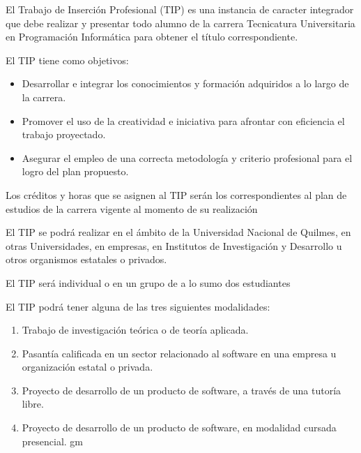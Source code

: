 


\articulo El Trabajo de Inserción Profesional (TIP) es una instancia de
caracter integrador que debe realizar y presentar todo alumno de la carrera
Tecnicatura Universitaria en Programación Informática para obtener el título
correspondiente.

\articulo El TIP tiene como objetivos:
\begin{itemize}
 \item Desarrollar e integrar los conocimientos y formación adquiridos a lo
 largo de la carrera.
 \item Promover el uso de la creatividad e iniciativa para afrontar con
 eficiencia el trabajo proyectado.
 \item Asegurar el empleo de una correcta metodología y criterio
 profesional para el logro del plan propuesto.
\end{itemize}

\articulo Los créditos y horas que se asignen al TIP serán los
correspondientes al plan de estudios de la carrera vigente al momento de su
realización


\articulo El TIP se podrá realizar en el ámbito de la Universidad Nacional de
Quilmes, en otras Universidades, en empresas, en Institutos de Investigación y
Desarrollo u otros organismos estatales o privados. 

\articulo El TIP será individual o en un grupo de a lo sumo dos estudiantes

\articulo El TIP podrá tener alguna de las tres siguientes modalidades:
\begin{enumerate}
\item Trabajo de investigación teórica o de teoría aplicada.
\item Pasantía calificada en un sector relacionado al software en una
empresa u organización estatal o privada.
\item Proyecto de desarrollo de un producto de software, a través de una tutoría libre.
\item Proyecto de desarrollo de un producto de software, en modalidad cursada presencial.
gm\end{enumerate}

